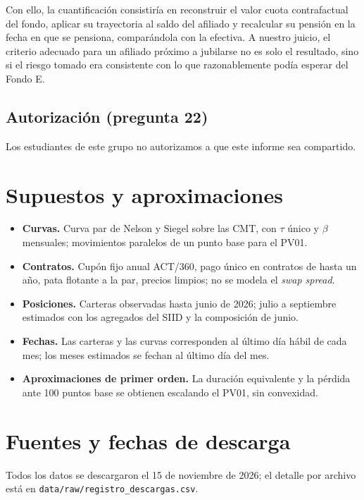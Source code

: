 \documentclass[11pt,letterpaper]{article}
\begin{document}
Con ello, la cuantificación consistiría en reconstruir el valor cuota contrafactual del
fondo, aplicar su trayectoria al saldo del afiliado y recalcular su pensión en la fecha
en que se pensiona, comparándola con la efectiva. A nuestro juicio, el criterio
adecuado para un afiliado próximo a jubilarse no es solo el resultado, sino si el
riesgo tomado era consistente con lo que razonablemente podía esperar del Fondo E.


\subsection{Autorización (pregunta 22)}
Los estudiantes de este grupo no autorizamos a que este informe sea compartido.

\appendix
\section{Supuestos y aproximaciones}

\begin{itemize}[leftmargin=*]
\item \textbf{Curvas.} Curva par de Nelson y Siegel sobre las CMT, con $\tau$ único y
$\beta$ mensuales; movimientos paralelos de un punto base para el PV01.
\item \textbf{Contratos.} Cupón fijo anual ACT/360, pago único en contratos de hasta un
año, pata flotante a la par, precios limpios; no se modela el \emph{swap spread}.
\item \textbf{Posiciones.} Carteras observadas hasta junio de 2026; julio a septiembre
estimados con los agregados del SIID y la composición de junio.
\item \textbf{Fechas.} Las carteras y las curvas corresponden al último día hábil de
cada mes; los meses estimados se fechan al último día del mes.
\item \textbf{Aproximaciones de primer orden.} La duración equivalente y la pérdida
ante 100 puntos base se obtienen escalando el PV01, sin convexidad.
\end{itemize}

\section{Fuentes y fechas de descarga}

Todos los datos se descargaron el 15 de noviembre de 2026; el detalle por archivo está
en \texttt{data/raw/registro\_descargas.csv}.
\end{document}
